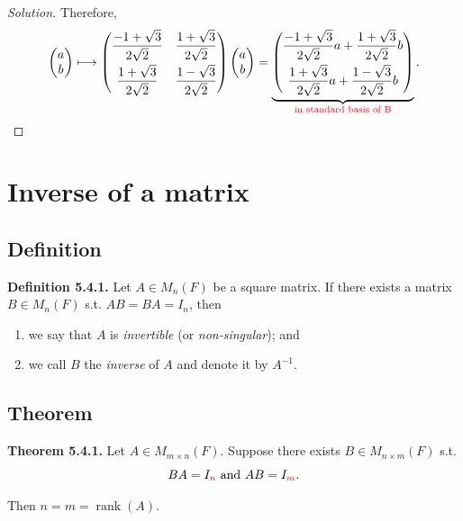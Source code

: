 \documentclass[12pt]{article}
\newenvironment{solution}
{\begin{proof}[Solution]}
{\end{proof}}
\begin{document}
\begin{solution}
Therefore,
\[
\begin{pmatrix}
a\\
b
\end{pmatrix}
\longmapsto
\begin{pmatrix}
\dfrac{-1+\sqrt3}{2\sqrt2}
&
\dfrac{1+\sqrt3}{2\sqrt2}
\\[3mm]
\dfrac{1+\sqrt3}{2\sqrt2}
&
\dfrac{1-\sqrt3}{2\sqrt2}
\end{pmatrix}
\begin{pmatrix}
a\\
b
\end{pmatrix}
=
\underbrace{
\begin{pmatrix}
\dfrac{-1+\sqrt3}{2\sqrt2}a
+\dfrac{1+\sqrt3}{2\sqrt2}b
\\[3mm]
\dfrac{1+\sqrt3}{2\sqrt2}a
+\dfrac{1-\sqrt3}{2\sqrt2}b
\end{pmatrix}
}_{\textcolor{red}{\text{in standard basis of B}}}.
\]

\end{solution}

\newpage

\section{Inverse of a matrix}

\subsection{Definition}

\textbf{Definition 5.4.1.}
Let $A\in M_n(F)$ be a square matrix. If there exists a matrix $B\in M_n(F)$ s.t. $AB=BA=I_n$,
then
\begin{enumerate}
    \item we say that $A$ is \emph{invertible} (or \emph{non-singular}); and

    \item we call $B$ the \emph{inverse} of $A$ and denote it by $A^{-1}$.
\end{enumerate}

\subsection{Theorem}

\textbf{Theorem 5.4.1.}
Let $A\in M_{m\times n}(F)$. Suppose there exists $B\in M_{n\times m}(F)$ s.t.
\[
BA=I_{\textcolor{red}{n}}\text{ and }AB=I_{\textcolor{red}{m}}.
\]

Then $n=m=\operatorname{rank}(A)$.
\end{document}

